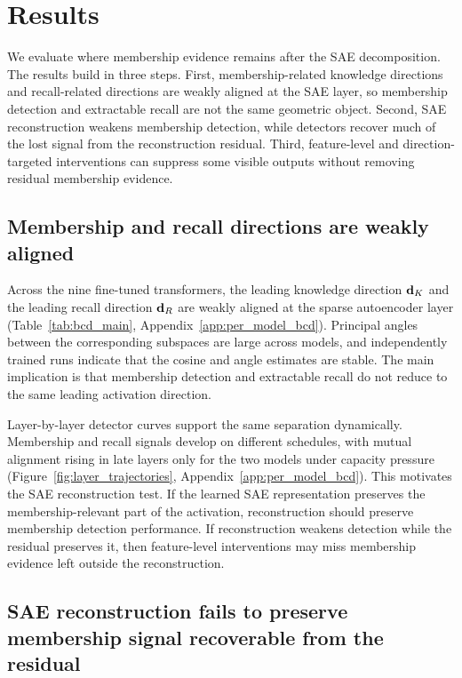 \section{Results}
\label{sec:results}

We evaluate where membership evidence remains after the SAE decomposition. The results build in three steps. First, membership-related knowledge
directions and recall-related directions are weakly aligned at the SAE layer, so membership detection and extractable recall are not the same geometric
object. Second, SAE reconstruction weakens membership detection, while detectors recover much of the lost signal from the reconstruction residual. Third,
feature-level and direction-targeted interventions can suppress some visible outputs without removing residual membership evidence.

\subsection{Membership and recall directions are weakly aligned}
\label{sec:results:geometry}

Across the nine fine-tuned transformers, the leading knowledge direction $\mathbf{d}_K$ and the leading recall direction $\mathbf{d}_R$ are weakly aligned at the sparse
autoencoder layer (Table~\ref{tab:bcd_main}, Appendix~\ref{app:per_model_bcd}). Principal angles between the corresponding subspaces are large across
models, and independently trained runs indicate that the cosine and angle estimates are stable. The main implication is that membership detection and
extractable recall do not reduce to the same leading activation direction.

Layer-by-layer detector curves support the same separation dynamically. Membership and recall signals develop on different schedules, with mutual alignment
rising in late layers only for the two models under capacity pressure (Figure~\ref{fig:layer_trajectories}, Appendix~\ref{app:per_model_bcd}). This
motivates the SAE reconstruction test. If the learned SAE representation preserves the membership-relevant part of the activation, reconstruction should
preserve membership detection performance. If reconstruction weakens detection while the residual preserves it, then feature-level interventions may miss
membership evidence left outside the reconstruction.

\subsection{SAE reconstruction fails to preserve membership signal recoverable from the residual}
\label{sec:results:dark}

